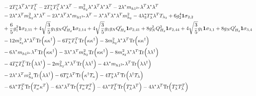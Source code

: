 {\begin{align}
 &-2 {T_{\lambda}^*  \lambda^{T}  \lambda^*  T_{\lambda}^{T}} -2 {T_{\lambda}^*  T_{\lambda}^{T}  \lambda^*  \lambda^{T}} - {m_{h_2}^2  \lambda^*  \lambda^{T}  \lambda^*  \lambda^{T}} -2 {\lambda^*  m_{{h 1}^{2 *}}  \lambda^{T}  \lambda^*  \lambda^{T}} \nonumber \\ 
 &-2 {\lambda^*  \lambda^{T}  m_{h_2}^2  \lambda^*  \lambda^{T}} -2 {\lambda^*  \lambda^{T}  \lambda^*  m_{{h 1}^{2 *}}  \lambda^{T}} - {\lambda^*  \lambda^{T}  \lambda^*  \lambda^{T}  m_{h_2}^2} -4 \lambda_3^* {T_{\lambda}^*  \lambda^{T}} T_{\lambda_3} +6 g_{2}^{4} {\bf 1} \sigma_{2,2} \nonumber \\ 
 &+\frac{6}{5} g_{1}^{2} {\bf 1} \sigma_{2,11} +4 \sqrt{\frac{3}{5}} g_1 g_N Q_{H_2}' {\bf 1} \sigma_{2,14} +4 \sqrt{\frac{3}{5}} g_1 g_N Q_{H_2}' {\bf 1} \sigma_{2,41} +8 g_{N}^{2} Q_{H_2}^{2} {\bf 1} \sigma_{2,44} +4 \sqrt{\frac{3}{5}} g_1 {\bf 1} \sigma_{3,1} +8 g_N Q_{H_2}' {\bf 1} \sigma_{3,4} \nonumber \\ 
 &-12 m_{s_3}^2 {\lambda^*  \lambda^{T}} \mbox{Tr}\Big({\kappa  \kappa^{\dagger}}\Big) -6 {T_{\lambda}^*  T_{\lambda}^{T}} \mbox{Tr}\Big({\kappa  \kappa^{\dagger}}\Big) -3 {m_{h_2}^2  \lambda^*  \lambda^{T}} \mbox{Tr}\Big({\kappa  \kappa^{\dagger}}\Big) \nonumber \\ 
 &-6 {\lambda^*  m_{{h 1}^{2 *}}  \lambda^{T}} \mbox{Tr}\Big({\kappa  \kappa^{\dagger}}\Big) -3 {\lambda^*  \lambda^{T}  m_{h_2}^2} \mbox{Tr}\Big({\kappa  \kappa^{\dagger}}\Big) -8 m_{s_3}^2 {\lambda^*  \lambda^{T}} \mbox{Tr}\Big({\lambda  \lambda^{\dagger}}\Big) \nonumber \\ 
 &-4 {T_{\lambda}^*  T_{\lambda}^{T}} \mbox{Tr}\Big({\lambda  \lambda^{\dagger}}\Big) -2 {m_{h_2}^2  \lambda^*  \lambda^{T}} \mbox{Tr}\Big({\lambda  \lambda^{\dagger}}\Big) -4 {\lambda^*  m_{{h 1}^{2 *}}  \lambda^{T}} \mbox{Tr}\Big({\lambda  \lambda^{\dagger}}\Big) \nonumber \\ 
 &-2 {\lambda^*  \lambda^{T}  m_{h_2}^2} \mbox{Tr}\Big({\lambda  \lambda^{\dagger}}\Big) -6 {T_{\lambda}^*  \lambda^{T}} \mbox{Tr}\Big({\kappa^{\dagger}  T_{\kappa}}\Big) -4 {T_{\lambda}^*  \lambda^{T}} \mbox{Tr}\Big({\lambda^{\dagger}  T_{\lambda}}\Big) \nonumber \\ 
 &-6 {\lambda^*  T_{\lambda}^{T}} \mbox{Tr}\Big({T_{\kappa}^*  \kappa^{T}}\Big) -6 {\lambda^*  \lambda^{T}} \mbox{Tr}\Big({T_{\kappa}^*  T_{\kappa}^{T}}\Big) -4 {\lambda^*  T_{\lambda}^{T}} \mbox{Tr}\Big({T_{\lambda}^*  \lambda^{T}}\Big) -4 {\lambda^*  \lambda^{T}} \mbox{Tr}\Big({T_{\lambda}^*  T_{\lambda}^{T}}\Big) \nonumber \\ 

\end{align}}
